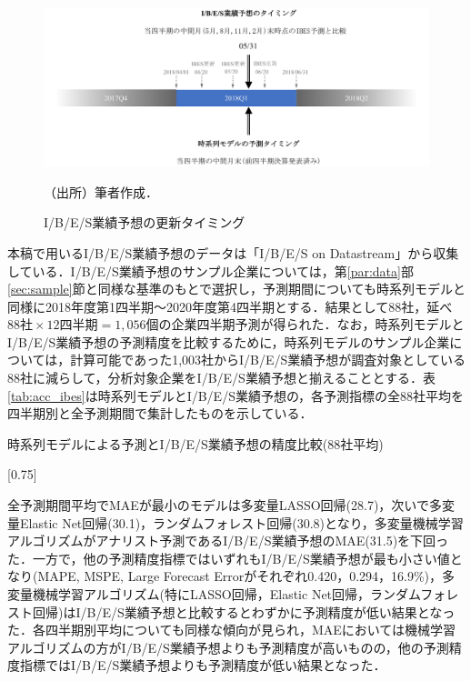 \documentclass[a4paper，11pt]{jsarticle}
\begin{document}
\begin{figure}[tbp]
  \centering
  \caption{I/B/E/S業績予想の更新タイミング}
  \label{fig:ibes_timing}
  \includegraphics[width=0.8\linewidth]{./img/_ibes_timing.pdf}
  \begin{threeparttable}
  \begin{tablenotes}
    \item[]（出所）筆者作成．
  \end{tablenotes}
  \end{threeparttable}
\end{figure}

本稿で用いるI/B/E/S業績予想のデータは「I/B/E/S on Datastream」から収集している．I/B/E/S業績予想のサンプル企業については，第\ref{par:data}部\ref{sec:sample}節と同様な基準のもとで選択し，予測期間についても時系列モデルと同様に2018年度第1四半期～2020年度第4四半期とする．結果として88社，延べ $88社 \times 12四半期 = 1,056個$の企業四半期予測が得られた．なお，時系列モデルとI/B/E/S業績予想の予測精度を比較するために，時系列モデルのサンプル企業については，計算可能であった1,003社からI/B/E/S業績予想が調査対象としている88社に減らして，分析対象企業をI/B/E/S業績予想と揃えることとする．表\ref{tab:acc_ibes}は時系列モデルとI/B/E/S業績予想の，各予測指標の全88社平均を四半期別と全予測期間で集計したものを示している．

\begin{landscape}
\begin{table}[tbp]
    \caption{時系列モデルによる予測とI/B/E/S業績予想の精度比較(88社平均)}
    \label{tab:acc_ibes}
    \scalebox{0.75}[0.75]{
      
    }
\end{table}
\end{landscape}

全予測期間平均でMAEが最小のモデルは多変量LASSO回帰(28.7)，次いで多変量Elastic Net回帰(30.1)，ランダムフォレスト回帰(30.8)となり，多変量機械学習アルゴリズムがアナリスト予測であるI/B/E/S業績予想のMAE(31.5)を下回った．一方で，他の予測精度指標ではいずれもI/B/E/S業績予想が最も小さい値となり(MAPE, MSPE, Large Forecast Errorがそれぞれ0.420，0.294，16.9\%)，多変量機械学習アルゴリズム(特にLASSO回帰，Elastic Net回帰，ランダムフォレスト回帰)はI/B/E/S業績予想と比較するとわずかに予測精度が低い結果となった．各四半期別平均についても同様な傾向が見られ，MAEにおいては機械学習アルゴリズムの方がI/B/E/S業績予想よりも予測精度が高いものの，他の予測精度指標ではI/B/E/S業績予想よりも予測精度が低い結果となった．
\end{document}
